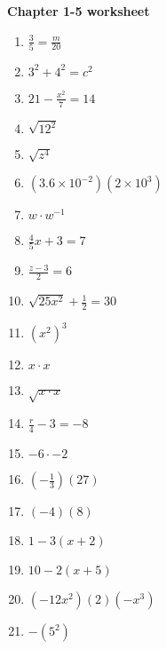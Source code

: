 \documentclass[12pt]{article}
\begin{document}
\Large

\textbf{ Chapter 1-5 worksheet }

\begin{multicols}{2}
\begin{enumerate}

	\item \( \frac{3}{5} = \frac{m}{20} \) \\
	\item \( 3^{2} + 4^{2} = c^{2} \) \\
	\item \( 21 - \frac{x^{2}}{7} = 14 \) \\
	\item \( \sqrt{12^{2}} \) \\
	\item \( \sqrt{z^{4}} \) \\
	\item \( (3.6 \times 10^{-2})(2 \times 10^{3}) \) \\
	\item \( w \cdot w^{-1} \) \\
	\item \( \frac{4}{5}x + 3 = 7 \) \\
	\item \( \frac{z - 3}{2} = 6 \) \\
	\item \( \sqrt{25x^{2}} + \frac{1}{2} = 30 \) \\
	\item \( (x^{2})^{3} \) \\
	\item \( x \cdot x \) \\
	\item \( \sqrt{ x \cdot x } \) \\
	\item \( \frac{r}{4} - 3 = -8 \) \\
	\item \( -6 \cdot -2 \) \\
	\item \( (-\frac{1}{3})(27) \) \\
	\item \( (-4) (8) \) \\
	\item \( 1 - 3(x+2) \) \\
	\item \( 10 - 2(x+5) \) \\
	\item \( (-12x^{2})(2)(-x^{3}) \) \\
	\item \( -(5^{2}) \) \\

\end{enumerate}
\end{multicols}
\end{document}
